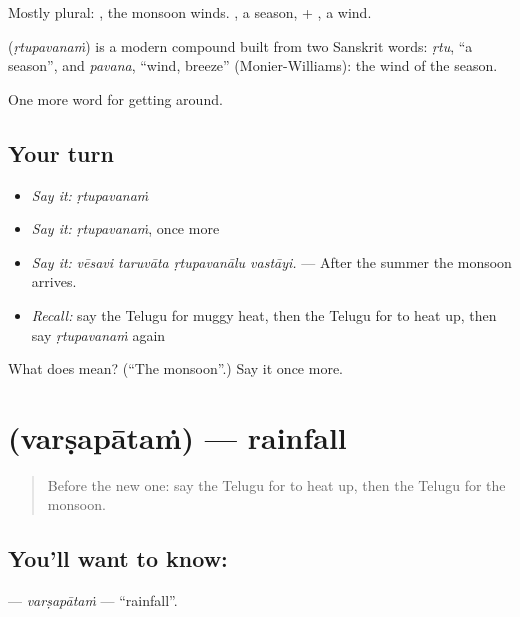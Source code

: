 Mostly plural: , the monsoon winds. , a season, + , a wind.

\begin{cousinweb}
\textbf{} (\emph{ṛtupavanaṁ}) is a modern compound built from two Sanskrit words: \emph{ṛtu}, \textquotedblleft{}a season\textquotedblright{}, and \emph{pavana}, \textquotedblleft{}wind, breeze\textquotedblright{} (Monier-Williams): the wind of the season.
\end{cousinweb}

\begin{grammarlens}[title={What you've built}]
One more word for getting around.
\end{grammarlens}

\subsection*{Your turn}
\begin{itemize}
\raggedright
  \item \emph{Say it:} \emph{ṛtupavanaṁ}
  \item \emph{Say it:} \emph{ṛtupavanaṁ}, once more
  \item \emph{Say it:} \emph{vēsavi taruvāta ṛtupavanālu vastāyi.} — After the summer the monsoon arrives.
  \item \emph{Recall:} say the Telugu for muggy heat, then the Telugu for to heat up, then say \emph{ṛtupavanaṁ} again
\end{itemize}

\begin{tcolorbox}[breakable,colback=teal!4,colframe=teal!35!black,title={Before you move on}]
What does  mean? (\textquotedblleft{}The monsoon\textquotedblright{}.) Say it once more.
\end{tcolorbox}
\section[\texorpdfstring{\te{వర్షపాతం} (varṣapātaṁ)}{వర్షపాతం (varṣapātaṁ)}]{ (varṣapātaṁ) — rainfall}

\label{lesson:TE-C477-varsapatam}



\begin{quote}
Before the new one: say the Telugu for to heat up, then the Telugu for the monsoon.
\end{quote}

\subsection*{You'll want to know: }
\textbf{} — \emph{varṣapātaṁ} — \textquotedblleft{}rainfall\textquotedblright{}.

